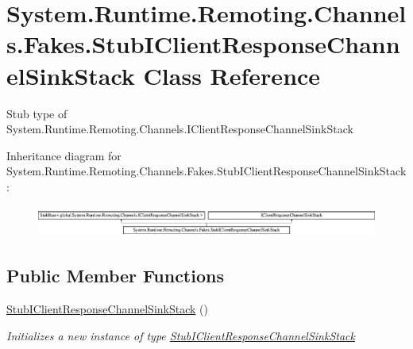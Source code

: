\hypertarget{class_system_1_1_runtime_1_1_remoting_1_1_channels_1_1_fakes_1_1_stub_i_client_response_channel_sink_stack}{\section{System.\-Runtime.\-Remoting.\-Channels.\-Fakes.\-Stub\-I\-Client\-Response\-Channel\-Sink\-Stack Class Reference}
\label{class_system_1_1_runtime_1_1_remoting_1_1_channels_1_1_fakes_1_1_stub_i_client_response_channel_sink_stack}
}


Stub type of System.\-Runtime.\-Remoting.\-Channels.\-I\-Client\-Response\-Channel\-Sink\-Stack 


Inheritance diagram for System.\-Runtime.\-Remoting.\-Channels.\-Fakes.\-Stub\-I\-Client\-Response\-Channel\-Sink\-Stack\-:\begin{figure}[H]
\begin{center}
\leavevmode
\includegraphics[height=1.054614cm]{class_system_1_1_runtime_1_1_remoting_1_1_channels_1_1_fakes_1_1_stub_i_client_response_channel_sink_stack}
\end{center}
\end{figure}
\subsection*{Public Member Functions}
\begin{DoxyCompactItemize}
\item 
\hyperlink{class_system_1_1_runtime_1_1_remoting_1_1_channels_1_1_fakes_1_1_stub_i_client_response_channel_sink_stack_a1cf3103311ef926fc9670c347654e5ca}{Stub\-I\-Client\-Response\-Channel\-Sink\-Stack} ()
\begin{DoxyCompactList}\small\item\em Initializes a new instance of type \hyperlink{class_system_1_1_runtime_1_1_remoting_1_1_channels_1_1_fakes_1_1_stub_i_client_response_channel_sink_stack}{Stub\-I\-Client\-Response\-Channel\-Sink\-Stack}\end{DoxyCompactList}\end{DoxyCompactItemize}

